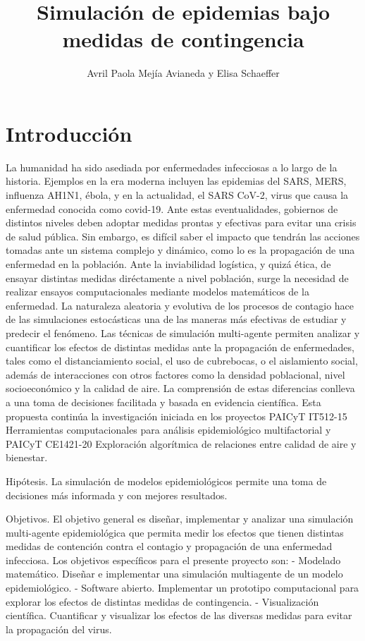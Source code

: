 \documentclass{sciposter}
\title{Simulación de epidemias bajo medidas de contingencia}
\author{Avril Paola Mejía Avianeda y Elisa Schaeffer}
\institute {Posgrado en Ingeniería de Sistemas}
\begin{document}

\maketitle

\section{Introducción}
La humanidad ha sido asediada por enfermedades infecciosas a lo largo de la historia. Ejemplos en la era moderna incluyen las epidemias del SARS, MERS, influenza AH1N1, ébola, y en
la actualidad, el SARS CoV-2, virus que causa la enfermedad conocida como covid-19. Ante estas eventualidades, gobiernos de distintos niveles deben adoptar medidas prontas y efectivas para evitar una crisis de salud pública. Sin embargo, es difícil saber el impacto que tendrán las acciones tomadas ante un sistema complejo y dinámico, como lo es la propagación de una enfermedad en la población. Ante la inviabilidad logística, y quizá ética, de ensayar distintas medidas diréctamente a nivel población, surge la necesidad de realizar ensayos computacionales mediante modelos matemáticos de la enfermedad. La naturaleza aleatoria y evolutiva de los procesos de contagio hace de las simulaciones estocásticas una de las maneras más efectivas de estudiar y predecir el fenómeno.
Las técnicas de simulación multi-agente permiten analizar y cuantificar los efectos de distintas medidas ante la propagación de enfermedades, tales como el distanciamiento social, el uso de cubrebocas, o el aislamiento social, además de interacciones con otros factores como la densidad poblacional, nivel socioeconómico y la calidad de aire. La comprensión de estas diferencias conlleva a una toma de decisiones facilitada y basada en evidencia científica. Esta propuesta continúa la investigación iniciada en los proyectos PAICyT IT512-15 Herramientas computacionales para análisis epidemiológico multifactorial y PAICyT CE1421-20 Exploración algorítmica de relaciones entre calidad de aire y bienestar.

Hipótesis.
La simulación de modelos epidemiológicos permite una toma de decisiones más informada
y con mejores resultados.

Objetivos.
El objetivo general es diseñar, implementar y analizar una simulación multi-agente epidemiológica que permita medir los efectos que tienen distintas medidas de contención contra el contagio y propagación de una enfermedad infecciosa.
Los objetivos específicos para el presente proyecto son:
- Modelado matemático. Diseñar e implementar una simulación multiagente de un modelo epidemiológico. 
- Software abierto. Implementar un prototipo computacional para explorar los efectos de distintas medidas de contingencia.
- Visualización científica. Cuantificar y visualizar los efectos de las diversas medidas para evitar la propagación del virus.
\end{document}
